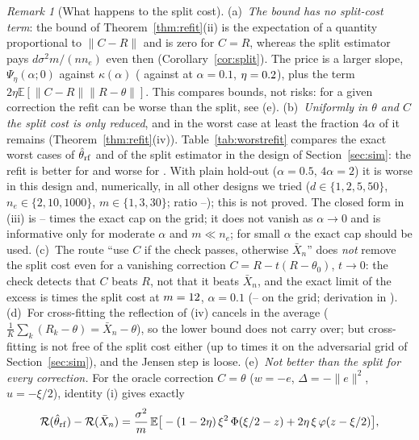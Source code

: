 \documentclass[10pt,a4paper]{article}
\theoremstyle{plain}
\theoremstyle{definition}
\theoremstyle{remark}
\newtheorem{remark}[theorem]{Remark}
\newcommand{\E}{\mathbb{E}}
\newcommand{\risk}{\mathcal{R}}
\newcommand{\norm}[1]{\lVert #1\rVert}
\begin{document}
\begin{remark}[What happens to the split cost]\label{rem:refitcost}
(a)~\emph{The bound has no split-cost term}: the bound of Theorem~\ref{thm:refit}(ii) is the expectation of a quantity proportional to $\norm{C-R}$ and is zero for $C=R$, whereas the split estimator pays $d\sigma^2m/(nn_e)$ even then (Corollary~\ref{cor:split}). The price is a larger slope, $\Psi_\eta(\alpha;0)$ against $\kappa(\alpha)$ (\RfPsiZeroTen{} against \KappaTen{} at $\alpha=0.1$, $\eta=0.2$), plus the term $2\eta\E[\norm{C-R}\norm{R-\theta}]$. This compares bounds, not risks: for a given correction the refit can be worse than the split, see (e).
(b)~\emph{Uniformly in $\theta$ and $C$ the split cost is only reduced}, and in the worst case at least the fraction $4\alpha$ of it remains (Theorem~\ref{thm:refit}(iv)). Table~\ref{tab:worstrefit} compares the exact worst cases of $\hat\theta_{\rm rf}$ and of the split estimator in the design of Section~\ref{sec:sim}: the refit is better for \RfBetterText{} and worse for \RfWorseText. With plain hold-out ($\alpha=0.5$, $4\alpha=2$) it is worse in this design and, numerically, in all \RfGenN{} other designs we tried ($d\in\{1,2,5,50\}$, $n_e\in\{2,10,1000\}$, $m\in\{1,3,30\}$; ratio \RfGenRatioMin--\RfGenRatioMax); this is not proved. The closed form in (iii) is \RfClosedMin--\RfClosedMax{} times the exact cap on the grid; it does not vanish as $\alpha\to0$ and is informative only for moderate $\alpha$ and $m\ll n_e$; for small $\alpha$ the exact cap should be used.
(c)~The route ``use $C$ if the check passes, otherwise $\bar X_n$'' does \emph{not} remove the split cost even for a vanishing correction $C=R-t(R-\theta_0)$, $t\to0$: the check detects that $C$ beats $R$, not that it beats $\bar X_n$, and the exact limit of the excess is \RfVOneTen{} times the split cost at $m=12$, $\alpha=0.1$ (\RfVOneMin--\RfVOneMax{} on the grid; derivation in ).
(d)~For cross-fitting the reflection of (iv) cancels in the average ($\frac1K\sum_k(R_k-\theta)=\bar X_n-\theta$), so the lower bound does not carry over; but cross-fitting is not free of the split cost either (up to \RfAcfMaxSplit{} times it on the adversarial grid of Section~\ref{sec:sim}), and the Jensen step is loose.
(e)~\emph{Not better than the split for every correction.} For the oracle correction $C=\theta$ ($w=-e$, $\Delta=-\norm e^2$, $u=-\xi/2$), identity (i) gives exactly
\[
\risk(\hat\theta_{\rm rf})-\risk(\bar X_n)=\frac{\sigma^2}{m}\,\E\big[-(1-2\eta)\,\xi^2\,\Phi(\xi/2-z)+2\eta\,\xi\,\varphi(z-\xi/2)\big],
\]
\end{remark}
\end{document}
